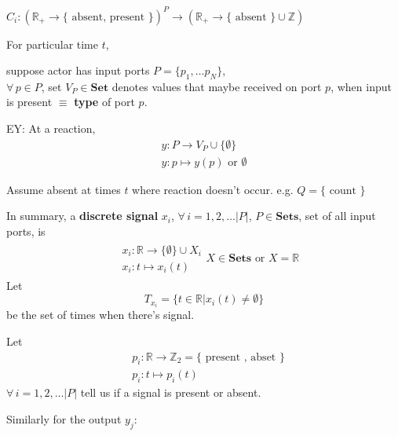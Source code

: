 \documentclass[10pt]{amsart}
\begin{document}
\begin{multicols*}{2}
$C_i:(\mathbb{R}_+ \to \lbrace \text{ absent, present } \rbrace )^P \to (\mathbb{R}_+ \to \lbrace \text{ absent } \rbrace \cup \mathbb{Z})$  

For particular time $t$, 

suppose actor has input ports $P=\lbrace p_1, \dots p_N \rbrace$, \\
$\forall \, p \in P$, set $V_P \in \mathbf{Set}$ denotes values that maybe received on port $p$, when input is present $\equiv$ \textbf{type} of port $p$.  

EY: At a reaction, 
\[
\begin{gathered}
	y: P \to V_P \cup \lbrace \emptyset \rbrace \\ 
	y: p \mapsto y(p) \text{ or } \emptyset 
\end{gathered}
\]

Assume absent at times $t$ where reaction doesn't occur.  
e.g. 
$Q = \lbrace \text{ count } \rbrace$ 

In summary, a \textbf{discrete signal} $x_i$, $\forall \, i = 1,2, \dots |P|$, $P\in \textbf{Sets}$, set of all input ports,  is
\begin{equation}
\boxed{ 
\begin{gathered}\begin{aligned}
& x_i: \mathbb{R} \to \lbrace \emptyset \rbrace \cup X_i \\ 
& x_i:t \mapsto x_i(t) 
\end{aligned} X\in \textbf{Sets} \text{ or } X = \mathbb{R}
\end{gathered}
}
\end{equation}
Let 
\begin{equation}
\boxed{ T_{x_i} = \lbrace t \in \mathbb{R} | x_i(t) \neq \emptyset \rbrace } 
\end{equation}
be the set of times when there's signal.  

Let 
\begin{equation}
\boxed{ \begin{aligned}
& p_i : \mathbb{R} \to \mathbb{Z}_2 = \lbrace \text{ present , abset } \rbrace \\ 
& p_i: t\mapsto p_i(t)  
\end{aligned} }
\end{equation}
$\forall \, i = 1,2, \dots |P | $ tell us if a signal is present or absent.   

Similarly for the output $y_j$: 














\end{multicols*}
\end{document}
